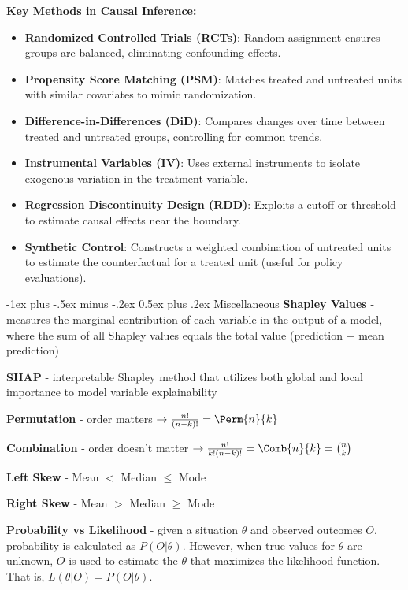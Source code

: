 \documentclass[10pt,landscape]{article}
\makeatletter
\renewcommand{\section}{\@startsection{section}{1}{0mm}%
                                {-1ex plus -.5ex minus -.2ex}%
                                {0.5ex plus .2ex}%
                                {\normalfont\large\bfseries}}
\makeatother
\begin{document}
\begin{multicols}{3}
\textbf{Key Methods in Causal Inference:}
\begin{itemize}[label={--},leftmargin=2mm]
    \setlength{\itemsep}{-0.8mm}
    \item \textbf{Randomized Controlled Trials (RCTs)}: Random assignment ensures groups are balanced, eliminating confounding effects.
    \item \textbf{Propensity Score Matching (PSM)}: Matches treated and untreated units with similar covariates to mimic randomization.
    \item \textbf{Difference-in-Differences (DiD)}: Compares changes over time between treated and untreated groups, controlling for common trends.
    \item \textbf{Instrumental Variables (IV)}: Uses external instruments to isolate exogenous variation in the treatment variable.
    \item \textbf{Regression Discontinuity Design (RDD)}: Exploits a cutoff or threshold to estimate causal effects near the boundary.
    \item \textbf{Synthetic Control}: Constructs a weighted combination of untreated units to estimate the counterfactual for a treated unit (useful for policy evaluations).
\end{itemize}


\section{Miscellaneous}
\textbf{Shapley Values} - measures the marginal contribution of each variable in the output of a model, where the sum of all Shapley values equals the total value (prediction $-$ mean prediction)

\textbf{SHAP} - interpretable Shapley method that utilizes both global and local importance to model variable explainability

\textbf{Permutation} - order matters  $\to \frac{n!}{(n-k)!} = \Perm{n}{k}$

\textbf{Combination} - order doesn't matter $\to \frac{n!}{k!(n-k)!}= \Comb{n}{k}= \binom nk$

\textbf{Left Skew} - Mean $<$ Median $\leq$ Mode

\textbf{Right Skew} - Mean $>$ Median $\geq$ Mode

\textbf{Probability vs Likelihood} - given a situation $\theta$ and observed outcomes $O$, probability is calculated as $P(O|\theta)$. However, when true values for $\theta$ are unknown, $O$ is used to estimate the $\theta$ that maximizes the likelihood function. That is, $L(\theta|O) = P(O|\theta)$.
\newpage
\end{multicols}
\end{document}
